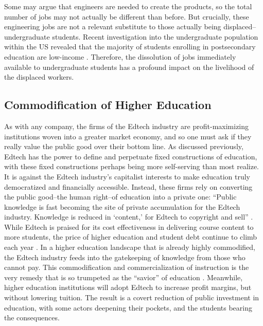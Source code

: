 \documentclass[10pt,twocolumn]{article}
\begin{document}
Some may argue that engineers are needed to create the products, so the total number of jobs may not actually be different than before. But crucially, these engineering jobs are not a relevant substitute to those actually being displaced–undergraduate students. Recent investigation into the undergraduate population within the US revealed that the majority of students enrolling in postsecondary education are low-income \cite{fountain_2019}. Therefore, the dissolution of jobs immediately available to undergraduate students has a profound impact on the livelihood of the displaced workers. 


\subsection{Commodification of Higher Education}
As with any company, the firms of the Edtech industry are profit-maximizing institutions woven into a greater market economy, and so one must ask if they really value the public good over their bottom line. As discussed previously, Edtech has the power to define and perpetuate fixed constructions of education, with these fixed constructions perhaps being more self-serving than most realize. It is against the Edtech industry’s capitalist interests to make education truly democratized and financially accessible. Instead, these firms rely on converting the public good–the human right–of education into a private one: “Public knowledge is fast becoming the site of private accumulation for the Edtech industry. Knowledge is reduced in ‘content,’ for Edtech to copyright and sell” \cite{mirrlees_2019}. While Edtech is praised for its cost effectiveness in delivering course content to more students, the price of higher education and student debt continue to climb each year\cite{brundick_2019} \cite{brown_2015}. In a higher education landscape that is already highly commodified, the Edtech industry feeds into the gatekeeping of knowledge from those who cannot pay. This commodification and commercialization of instruction is the very remedy that is so trumpeted as the “savior” of education \cite{noble_1998}. Meanwhile, higher education institutions will adopt Edtech to increase profit margins, but without lowering tuition. The result is a covert reduction of public investment in education, with some actors deepening their pockets, and the students bearing the consequences.
\end{document}
